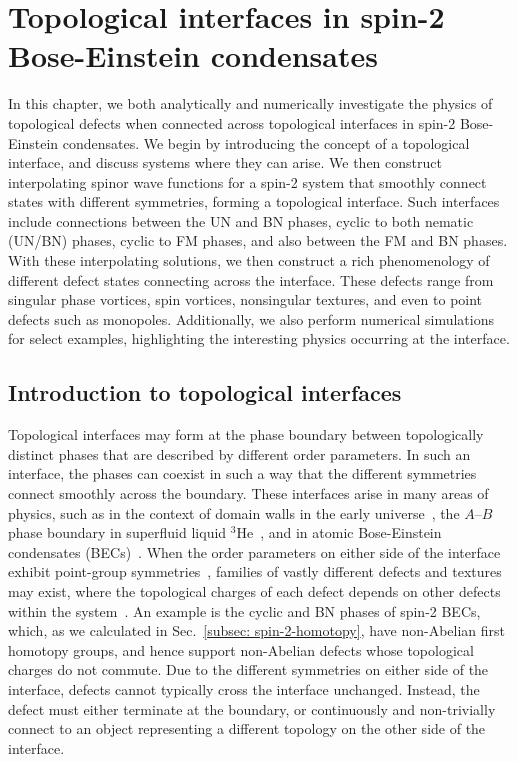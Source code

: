 \chapter{\label{chap: spin-2}
Topological interfaces in spin-2 Bose-Einstein condensates}
In this chapter, we both analytically and numerically investigate the physics
of topological defects when connected across topological interfaces in spin-2
Bose-Einstein condensates.
We begin by introducing the concept of a topological interface, and discuss
systems where they can arise.
We then construct interpolating spinor wave functions for a spin-2 system that
smoothly connect states with different symmetries, forming a topological
interface.
Such interfaces include connections between the UN and BN phases, cyclic to both
nematic (UN/BN) phases, cyclic to FM phases, and also between the FM and BN
phases.
With these interpolating solutions, we then construct a rich phenomenology of
different defect states connecting across the interface.
These defects range from singular phase vortices, spin vortices, nonsingular
textures, and even to point defects such as monopoles.
Additionally, we also perform numerical simulations for select examples,
highlighting the interesting physics occurring at the interface.

\section{Introduction to topological interfaces}
Topological interfaces may form at the phase boundary between
topologically distinct phases that are described by different order parameters.
In such an interface, the phases can coexist in such a way that the different
symmetries connect smoothly across the boundary.
These interfaces arise in many areas of physics, such as in the context of
domain walls in the early universe~\cite{Zeldovich1975,Kibble1976,Kibble1980},
the \(A\)--\(B\) phase boundary in superfluid liquid \(^3\)He~\cite{
    Osheroff1977,Yip1986,Salomaa1987,Finne2006,Bradley2008,Volovik2009}, and in
atomic Bose-Einstein condensates (BECs)~\cite{Takeuchi2006,Kasamatsu2010,
    Borgh2012,Borgh2013, Borgh2014,Kaneda2014}.
When the order parameters on either side of the interface exhibit point-group
symmetries~\cite{Xiao2022}, families of vastly different defects
and textures may exist, where the topological charges of each defect depends
on other defects within the system~\cite{Poenaru1977, Mermin1979}.
An example is the cyclic and BN phases of spin-2 BECs, which, as we calculated
in Sec.~\ref{subsec: spin-2-homotopy}, have non-Abelian first homotopy groups,
and hence support non-Abelian defects whose topological charges do not commute.
Due to the different symmetries on either side of the interface, defects cannot
typically cross the interface unchanged.
Instead, the defect must either terminate at the boundary, or continuously
and non-trivially connect to an object representing a different topology on the
other side of the interface.

